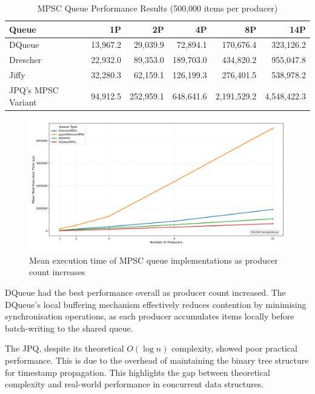 \begin{table}[htb]
\centering
\caption{\ac{MPSC} Queue Performance Results (500,000 items per producer)}
\label{tab:mpsc-results}
\begin{tabular}{@{}lrrrrr@{}}
\toprule
Queue & 1P & 2P & 4P & 8P & 14P \\
\midrule
DQueue & 13,967.2 & 29,039.9 & 72,894.1 & 170,676.4 & 323,126.2 \\
Drescher & 22,932.0 & 89,353.0 & 189,703.0 & 434,820.2 & 955,047.8 \\
Jiffy & 32,280.3 & 62,159.1 & 126,199.3 & 276,401.5 & 538,978.2 \\
\ac{JPQ}'s \ac{MPSC} Variant & 94,912.5 & 252,959.1 & 648,641.6 & 2,191,529.2 & 4,548,422.3 \\
\bottomrule
\end{tabular}
\end{table}

\begin{figure}[htb]
\centering
\caption{Mean execution time of MPSC queue implementations as producer count increases}
\label{fig:mpsc-mean-performance}
\includegraphics[width=\textwidth]{images/results/mpsc_mean_performance_vs_producers.png}
\end{figure}

DQueue had the best performance overall as producer count increased. The DQueue's local buffering mechanism effectively reduces contention by minimising synchronisation operations, as each producer accumulates items locally before batch-writing to the shared queue.

The \ac{JPQ}, despite its theoretical $O(\log n)$ complexity, showed poor practical performance. This is due to the overhead of maintaining the binary tree structure for timestamp propagation. This highlights the gap between theoretical complexity and real-world performance in concurrent data structures.

